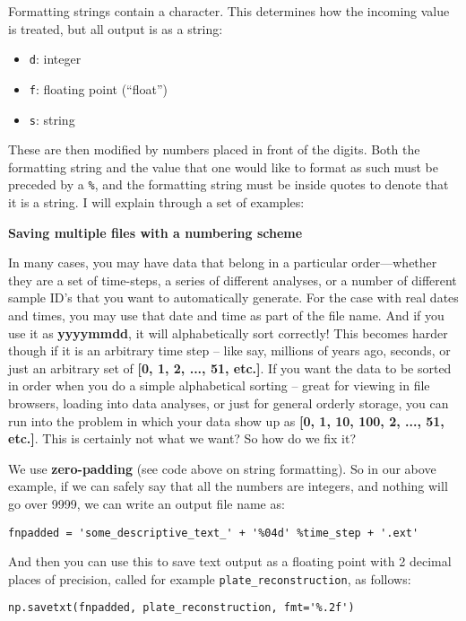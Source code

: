 \documentclass[a4paper,10pt]{scrartcl}
\begin{document}
Formatting strings contain a character. This determines how the incoming value is treated, but all output is as a string:
\begin{itemize}
 \item \lstinline{d}: integer
 \item \lstinline{f}: floating point (``float'')
 \item \lstinline{s}: string
\end{itemize}

These are then modified by numbers placed in front of the digits. Both the formatting string and the value that one would like to format as such must be preceded by a \lstinline{%}, and the formatting string must be inside quotes to denote that it is a string. I will explain through a set of examples:



\begin{framed}
\noindent\textbf{Saving multiple files with a numbering scheme}

In many cases, you may have data that belong in a particular order---whether they are a set of time-steps, a series of different analyses, or a number of different sample ID's that you want to automatically generate. For the case with real dates and times, you may use that date and time as part of the file name. And if you use it as \textbf{yyyymmdd}, it will alphabetically sort correctly! This becomes harder though if it is an arbitrary time step -- like say, millions of years ago, seconds, or just an arbitrary set of \textbf{[0, 1, 2, ..., 51, etc.]}. If you want the data to be sorted in order when you do a simple alphabetical sorting -- great for viewing in file browsers, loading into data analyses, or just for general orderly storage, you can run into the problem in which your data show up as \textbf{[0, 1, 10, 100, 2, ..., 51, etc.]}. This is certainly not what we want? So how do we fix it?

We use \textbf{zero-padding} (see code above on string formatting). So in our above example, if we can safely say that all the numbers are integers, and nothing will go over 9999, we can write an output file name as:

\lstinline{fnpadded = 'some_descriptive_text_' + '%04d' %time_step + '.ext'}

And then you can use this to save text output as a floating point with 2 decimal places of precision, called for example \lstinline{plate_reconstruction}, as follows:

\lstinline{np.savetxt(fnpadded, plate_reconstruction, fmt='%.2f')}

\end{framed}
\end{document}
